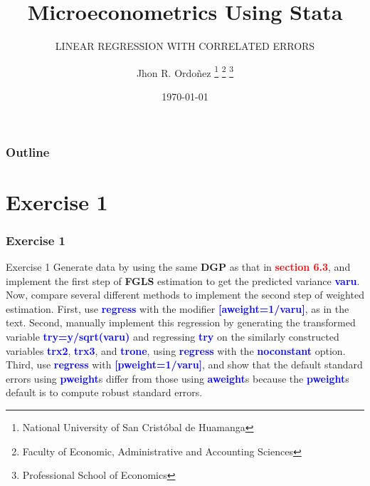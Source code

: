 \documentclass[11pt, aspectratio=169]{beamer}
\title{Microeconometrics Using Stata}
\subtitle{LINEAR REGRESSION WITH CORRELATED ERRORS}
\author{
		Jhon R. Ordoñez
		\footnote{\label{1} National University of San Cristóbal de Huamanga}
		\footnote{\label{2} Faculty of Economic, Administrative and Accounting Sciences}
		\footnote{\label{3} Professional School of Economics}
	}
\date{\today}
\begin{document}
	\begin{frame}
		\maketitle
	\end{frame}
	\begin{frame}[t]
		\frametitle{Outline}
		\tableofcontents
	\end{frame}
	\section{Exercise 1}
		\begin{frame}
			\frametitle{Exercise 1}
				\begin{block}{Exercise 1}
					Generate data by using the same \textbf{DGP} as that in \textcolor{red}{\textbf{section 6.3}}, and
					implement the first step of \textbf{FGLS} estimation to get the predicted
					variance \textcolor{blue}{\textbf{varu}}. Now, compare several different methods to implement
					the second step of weighted estimation. First, use \textcolor{blue}{\textbf{regress}} with the
					modifier \textcolor{blue}{\textbf{[aweight=1/varu]}}, as in the text. Second, manually
					implement this regression by generating the transformed variable
					\textcolor{blue}{\textbf{try=y/sqrt(varu)}} and regressing \textcolor{blue}{\textbf{try}} on the similarly constructed
					variables \textcolor{blue}{\textbf{trx2}}, \textcolor{blue}{\textbf{trx3}}, and \textcolor{blue}{\textbf{trone}}, using \textcolor{blue}{\textbf{regress}} with the \textcolor{blue}{\textbf{noconstant}}          
					option. Third, use \textcolor{blue}{\textbf{regress}} with \textcolor{blue}{\textbf{[pweight=1/varu]}}, and show that the
					default standard errors using \textcolor{blue}{\textbf{pweight}}s differ from those using
					\textcolor{blue}{\textbf{aweight}}s because the \textcolor{blue}{\textbf{pweight}}s default is to compute robust standard
					errors.
				\end{block}
		\end{frame}
\end{document}
